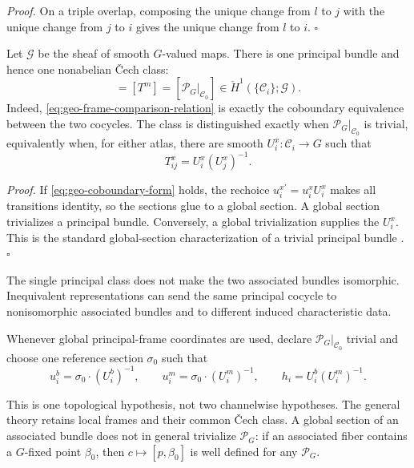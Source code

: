 \noindent\emph{Proof.}
On a triple overlap, composing the unique change from $l$ to $j$ with the unique change from $j$
to $i$ gives the unique change from $l$ to $i$. \hfill$\square$

Let $\mathcal G$ be the sheaf of smooth $G$-valued maps.  There is one principal bundle and hence
one nonabelian \v{C}ech class:
\begin{equation}
[T^b]=[T^m]=[\mathscr P_G|_{\mathcal C_0}]
\in\check H^1(\{\mathcal C_i\};\mathcal G).
\label{eq:geo-cech-class}
\end{equation}
Indeed, \eqref{eq:geo-frame-comparison-relation} is exactly the coboundary equivalence between
the two cocycles.  The class is distinguished exactly when $\mathscr P_G|_{\mathcal C_0}$ is trivial,
equivalently when, for either atlas, there are smooth $U_i^x:\mathcal C_i\to G$ such that
\begin{equation}
T_{ij}^x=U_i^x(U_j^x)^{-1}.
\label{eq:geo-coboundary-form}
\end{equation}

\noindent\emph{Proof.}
If \eqref{eq:geo-coboundary-form} holds, the rechoice $u_i^{x\prime}=u_i^xU_i^x$ makes all
transitions identity, so the sections glue to a global section.  A global section trivializes a
principal bundle.  Conversely, a global trivialization supplies the $U_i^x$.  This is the standard
global-section characterization of a trivial principal bundle
\citep{Steenrod1951,Husemoller1994,Kobayashi1963}. \hfill$\square$

The single principal class does not make the two associated bundles isomorphic.  Inequivalent
representations can send the same principal cocycle to nonisomorphic associated bundles and to
different induced characteristic data.

\medskip
{}
Whenever global principal-frame coordinates are used, declare $\mathscr P_G|_{\mathcal C_0}$ trivial and
choose one reference section $\sigma_0$ such that
\begin{equation}
u_i^b=\sigma_0\cdot(U_i^b)^{-1},
\qquad
u_i^m=\sigma_0\cdot(U_i^m)^{-1},
\qquad
h_i=U_i^b(U_i^m)^{-1}.
\label{eq:geo-frame-field}
\end{equation}
\medskip

This is one topological hypothesis, not two channelwise hypotheses.  The general theory retains
local frames and their common \v{C}ech class.  A global section of an associated bundle does not
in general trivialize $\mathscr P_G$: if an associated fiber contains a $G$-fixed point $\beta_0$, then
$c\mapsto[p,\beta_0]$ is well defined for any $\mathscr P_G$. 

